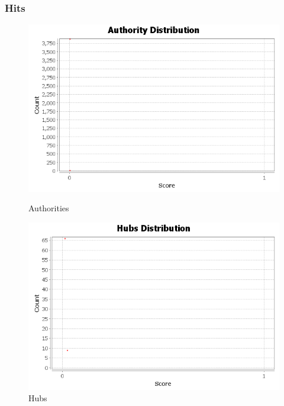 \documentclass[12pt]{article}
\begin{document}
\subsubsection{Hits}
\begin{figure}[h!]
\includegraphics[scale=0.7]{../Q3/hits/authorities}
\caption{Authorities}
\includegraphics[scale=0.7]{../Q3/hits/hubs}
\caption{Hubs}
\end{figure}
\newpage
\end{document}
